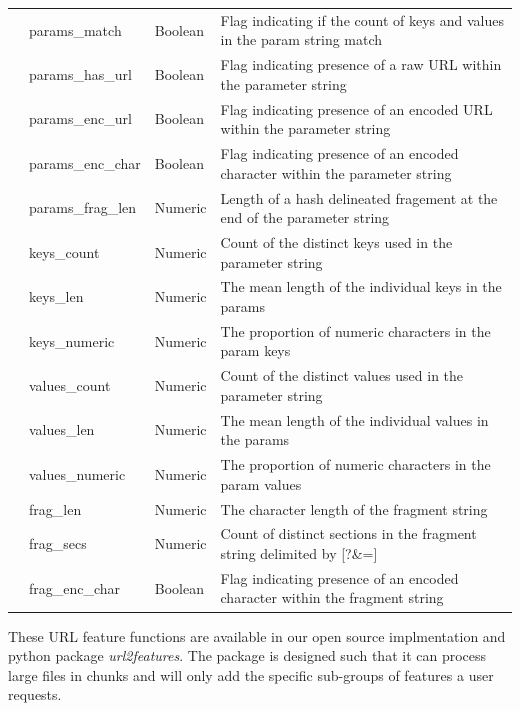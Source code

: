 \documentclass[sigconf]{acmart}
\begin{document}
\begin{table}
\begin{tabular}{|l|l|l|l|}
              &params\_match          &Boolean     &Flag indicating if the count of keys and values in the param string match    \\
              &params\_has\_url       &Boolean     &Flag indicating presence of a raw URL within the parameter string   \\
              &params\_enc\_url       &Boolean     &Flag indicating presence of an encoded URL within the parameter string   \\
              &params\_enc\_char      &Boolean     &Flag indicating presence of an encoded character within the parameter string   \\
              &params\_frag\_len      &Numeric     &Length of a hash delineated fragement at the end of the parameter string   \\
              &keys\_count            &Numeric     &Count of the distinct keys used in the parameter string  \\
              &keys\_len              &Numeric     &The mean length of the individual keys in the params  \\
              &keys\_numeric          &Numeric     &The proportion of numeric characters in the param keys \\
              &values\_count          &Numeric     &Count of the distinct values used in the parameter string  \\
              &values\_len            &Numeric     &The mean length of the individual values in the params  \\
              &values\_numeric        &Numeric     &The proportion of numeric characters in the param values \\
              &frag\_len              &Numeric     &The character length of the fragment string    \\
              &frag\_secs             &Numeric     &Count of distinct sections in the fragment string delimited by [?\&=]  \\
              &frag\_enc\_char        &Boolean     &Flag indicating presence of an encoded character within the fragment string    \\
\bottomrule
\end{tabular}
\end{table}


These URL feature functions are available in our open source implmentation and python package \emph{url2features}. 
The package is designed such that it can process large files in chunks and will only add the specific sub-groups of
features a user requests.
\end{document}
